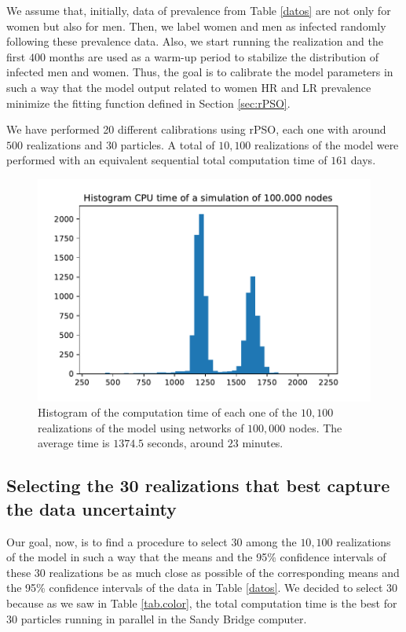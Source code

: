 We assume that, initially, data of prevalence from Table \ref{datos} are not only for women but also for men. Then, we label women and men as infected randomly following these prevalence data. Also, we start running the realization and the first $400$ months are used as a warm-up period to stabilize the distribution of infected men and women. Thus, the goal is to calibrate the model parameters in such a way that the model output related to women HR and LR prevalence minimize the fitting function defined in Section \ref{sec:rPSO}.

We have performed 20 different calibrations using rPSO, each one with around $500$ realizations and $30$ particles. A total of $10,100$ realizations of the model were performed with an equivalent sequential total computation time of $161$ days.

\begin{figure}[h!]
	\centering
	\includegraphics[width=0.6\linewidth]{IMGs/1.-Calibrado/Hist_CPU_time.pdf}
	\caption{Histogram of the computation time of each one of the $10,100$ realizations of the model using networks of $100,000$ nodes. The average time is $1374.5$ seconds, around $23$ minutes.}
\end{figure}

\subsection{Selecting the 30 realizations that best capture the data uncertainty}
Our goal, now, is to find a procedure to select $30$ among the $10,100$ realizations of the model in such a way that the means and the 95\% confidence intervals of these $30$ realizations be as much close as possible of the corresponding means and the 95\% confidence intervals of the data in Table \ref{datos}. We decided to select $30$ because as we saw in Table \ref{tab.color}, the total computation time is the best for $30$ particles running in parallel in the Sandy Bridge computer.

